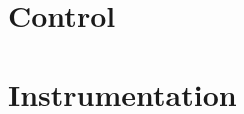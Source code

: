 \documentclass{hdnotes}
\begin{document}
\part{Control}







\part{Instrumentation}







\end{document}
